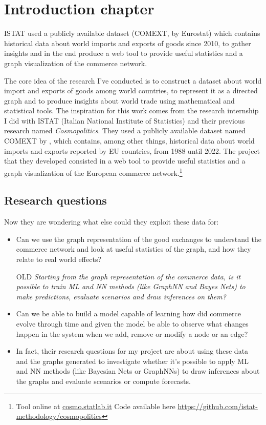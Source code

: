 \chapter{Introduction chapter}

ISTAT used a publicly available dataset (COMEXT, by Eurostat) which contains historical data about world imports and exports of goods since 2010, to gather insights and in the end produce a web tool to provide useful statistics and a graph visualization of the commerce network. 

The core idea of the research I've conducted is to construct a dataset about world import and exports of goods among world countries, to represent it as a directed graph and to produce insights about world trade using mathematical and statistical tools.
The inspiration for this work comes from the research internship I did with ISTAT (Italian National Institute of Statistics) and their previous research named \textit{Cosmopolitics}. %
They used a publicly available dataset named COMEXT by \textcite{eurostat2022comext}, which contains, among other things, historical data about world imports and exports reported by EU countries, from 1988 until 2022. The project that they developed consisted in a web tool to provide useful statistics and a graph visualization of the European commerce network.\footnote{Tool online at  \href{https://cosmo.statlab.it/}{cosmo.statlab.it} Code available here \url{https://github.com/istat-methodology/cosmopolitics}}


\section{Research questions}

Now they are wondering what else could they exploit these data for:
\begin{itemize}
    \item Can we use the graph representation of the good exchanges to understand the commerce network and look at useful statistics of the graph, and how they relate to real world effects?
    \item[OLD] \textit{Starting from the graph representation of the commerce data, is it possible to train ML and NN methods (like GraphNN and Bayes Nets) to make predictions, evaluate scenarios and draw inferences on them?}
    \item Can we be able to build a model capable of learning how did commerce evolve through time and given the model be able to observe what changes happen in the system when we add, remove or modify a node or an edge?
    \item In fact, their research questions for my project are about using these data and the graphs generated to investigate whether it’s possible to apply ML and NN methods (like Bayesian Nets or GraphNNs) to draw inferences about the graphs and evaluate scenarios or compute forecasts.
\end{itemize}